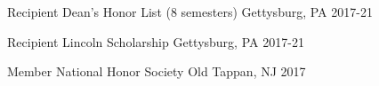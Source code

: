 \begin{cvhonors}
\cvhonor
{Recipient} %
{Dean's Honor List (8 semesters)} %
{Gettysburg, PA} %
{2017-21} %


\cvhonor
{Recipient} %
{Lincoln Scholarship} %
{Gettysburg, PA} %
{2017-21} %


\cvhonor
{Member} %
{National Honor Society} %
{Old Tappan, NJ} %
{2017} %


\end{cvhonors}

